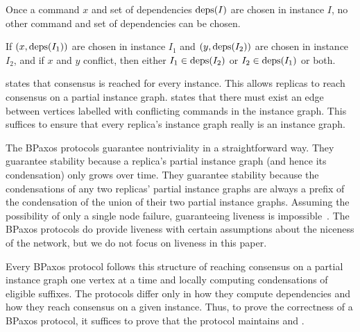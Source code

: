 \begin{invariant}
  Once a command $x$ and set of dependencies $\text{deps}(I)$ are chosen in instance
  $I$, no other command and set of dependencies can be chosen.
\end{invariant}
\begin{invariant}
  If $(x, \text{deps}(I_1))$ are chosen in instance $I_1$ and $(y, \text{deps}(I_2))$ are
  chosen in instance $I_2$, and if $x$ and $y$ conflict, then either $I_1 \in
  \text{deps}(I_2)$ or $I_2 \in \text{deps}(I_1)$ or both.
\end{invariant}

 states that consensus is reached for every
instance. This allows replicas to reach consensus on a partial instance graph.
 states that there must exist an edge between
vertices labelled with conflicting commands in the instance graph. This
suffices to ensure that every replica's instance graph really is an instance
graph.

The BPaxos protocols guarantee nontriviality in a straightforward way. They
guarantee stability because a replica's partial instance graph (and hence its
condensation) only grows over time. They guarantee stability because the
condensations of any two replicas' partial instance graphs are always a prefix
of the condensation of the union of their two partial instance graphs. Assuming
the possibility of only a single node failure, guaranteeing liveness is
impossible~\cite{fischer1982impossibility}. The BPaxos protocols do provide
liveness with certain assumptions about the niceness of the network, but we do
not focus on liveness in this paper.

Every BPaxos protocol follows this structure of reaching consensus on a partial
instance graph one vertex at a time and locally computing condensations of
eligible suffixes. The protocols differ only in how they compute dependencies
and how they reach consensus on a given instance. Thus, to prove the
correctness of a BPaxos protocol, it suffices to prove that the protocol
maintains  and .
